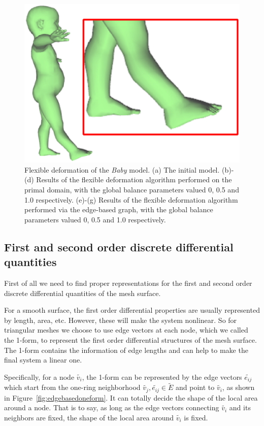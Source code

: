 \begin{figure} [htbp]
{\begin{minipage}[b]{0.3\textwidth}
      \includegraphics[scale=0.33]{figs/f5.1.edge10-iso-3.eps}
    \end{minipage}}
  \caption{Flexible deformation of the \textit{Baby} model. (a) The initial model. (b)-(d) Results of the flexible deformation algorithm performed on the primal domain, with the global balance parameters valued 0, 0.5 and 1.0 respectively. (e)-(g) Results of the flexible deformation algorithm performed via the edge-based graph, with the global balance parameters valued 0, 0.5 and 1.0 respectively.}
  \label{fig:deformbaby} %
\end{figure}






\subsection{First and second order discrete differential
quantities} First of all we need to find proper  representations for
the first and second order discrete differential quantities of the
mesh surface.

For a smooth surface, the  first order differential properties are
usually represented by length, area, etc. However, these will make
the system nonlinear. So for triangular meshes we choose to use edge
vectors at each node, which we called the 1-form, to represent the
first order differential structures of the mesh surface. The 1-form
contains the information of edge lengths and can help to make the
final system a linear one.

Specifically, for a  node $\tilde{v_i}$, the 1-form can be
represented by the edge vectors $\tilde{e_{ij}}$ which start from
the one-ring neighborhood $\tilde{v_j},\tilde{e_{ij}}\in \tilde{E}$
and point to $\tilde{v_i}$, as shown in
Figure~\ref{fig:edgebasedoneform}. It can totally decide the shape
of the local area around a node. That is to say, as long as the edge
vectors connecting $\tilde{v_i}$ and its neighbors are fixed, the
shape of the local area around $\tilde{v_i}$ is fixed.

